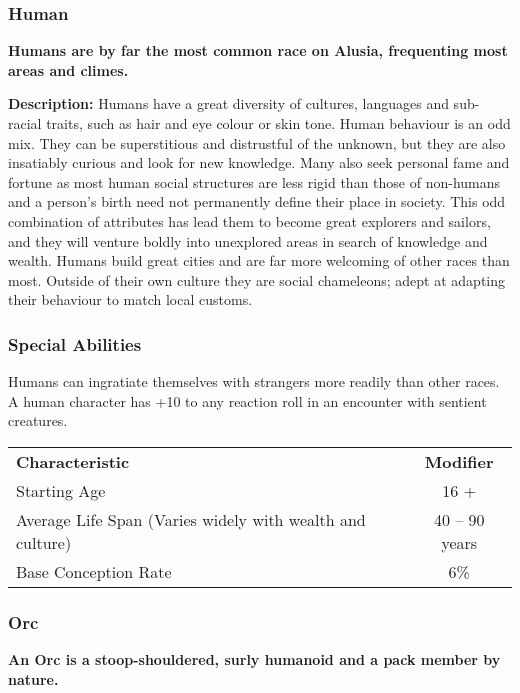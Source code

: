 \begin{multicols*}{3}
\subsubsection{Human}

\textbf{Humans are by far the most common race on Alusia, frequenting
most areas and climes.}

\textbf{Description:} Humans have a great diversity of cultures,
languages and sub-racial traits, such as hair and eye colour or skin
tone. Human behaviour is an odd mix.  They can be superstitious and
distrustful of the unknown, but they are also insatiably curious and
look for new knowledge.  Many also seek personal fame and fortune as
most human social structures are less rigid than those of non-humans
and a person's birth need not permanently define their place in
society.  This odd combination of attributes has lead them to become
great explorers and sailors, and they will venture boldly into
unexplored areas in search of knowledge and wealth.  Humans build
great cities and are far more welcoming of other races than most.
Outside of their own culture they are social chameleons; adept at
adapting their behaviour to match local customs.

\subsubsection{Special Abilities}

\begin{Enumerate}
\item
Humans can ingratiate themselves with strangers more readily than
other races.  A human character has +10 to any reaction roll in an
encounter with sentient creatures.
\end{Enumerate}
\begin{tabularx}{\linewidth}{Xc}
\textbf{Characteristic} & \textbf{Modifier} \\
Starting Age			& 16 + \\
Average Life Span (Varies widely with wealth and culture) & 40 -- 90 years \\
Base Conception Rate		& 6\% \\
\end{tabularx}

\subsubsection{Orc}

\textbf{An Orc is a stoop-shouldered, surly humanoid and a pack
member by nature.}


\end{multicols*}
